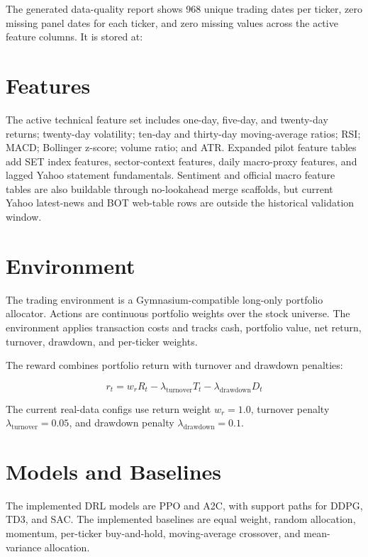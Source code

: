 \documentclass[11pt]{article}
\begin{document}
The generated data-quality report shows 968 unique trading dates per ticker, zero missing panel dates for each ticker, and zero missing values across the active feature columns. It is stored at:

\begin{quote}
\end{quote}

\section{Features}
The active technical feature set includes one-day, five-day, and twenty-day returns; twenty-day volatility; ten-day and thirty-day moving-average ratios; RSI; MACD; Bollinger z-score; volume ratio; and ATR. Expanded pilot feature tables add SET index features, sector-context features, daily macro-proxy features, and lagged Yahoo statement fundamentals. Sentiment and official macro feature tables are also buildable through no-lookahead merge scaffolds, but current Yahoo latest-news and BOT web-table rows are outside the historical validation window.

\section{Environment}
The trading environment is a Gymnasium-compatible long-only portfolio allocator. Actions are continuous portfolio weights over the stock universe. The environment applies transaction costs and tracks cash, portfolio value, net return, turnover, drawdown, and per-ticker weights.

The reward combines portfolio return with turnover and drawdown penalties:

\[
r_t = w_r R_t - \lambda_{\mathrm{turnover}} T_t - \lambda_{\mathrm{drawdown}} D_t
\]

The current real-data configs use return weight $w_r=1.0$, turnover penalty $\lambda_{\mathrm{turnover}}=0.05$, and drawdown penalty $\lambda_{\mathrm{drawdown}}=0.1$.

\section{Models and Baselines}
The implemented DRL models are PPO and A2C, with support paths for DDPG, TD3, and SAC. The implemented baselines are equal weight, random allocation, momentum, per-ticker buy-and-hold, moving-average crossover, and mean-variance allocation.
\end{document}
